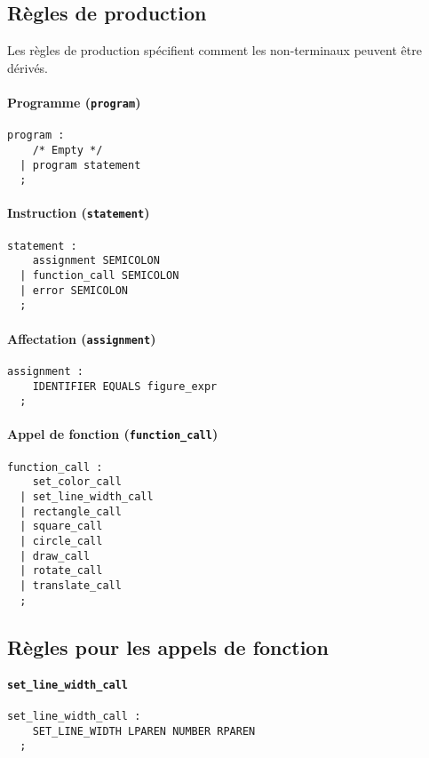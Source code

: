 \documentclass[12pt,a4paper]{article}
\begin{document}
\subsection{Règles de production}
Les règles de production spécifient comment les non-terminaux peuvent être dérivés.

\paragraph{Programme (\texttt{program})}
\begin{verbatim}
program :
    /* Empty */
  | program statement
  ;
\end{verbatim}

\paragraph*{Instruction (\texttt{statement})}
\begin{verbatim}
statement :
    assignment SEMICOLON
  | function_call SEMICOLON
  | error SEMICOLON
  ;
\end{verbatim}

\paragraph{Affectation (\texttt{assignment})}
\begin{verbatim}
assignment :
    IDENTIFIER EQUALS figure_expr
  ;
\end{verbatim}

\paragraph{Appel de fonction (\texttt{function\_call})}
\begin{verbatim}
function_call :
    set_color_call
  | set_line_width_call
  | rectangle_call
  | square_call
  | circle_call
  | draw_call
  | rotate_call
  | translate_call
  ;
\end{verbatim}

\subsection{Règles pour les appels de fonction}
\paragraph*{\texttt{set\_line\_width\_call}}
\begin{verbatim}
set_line_width_call :
    SET_LINE_WIDTH LPAREN NUMBER RPAREN
  ;
\end{verbatim}
\end{document}
